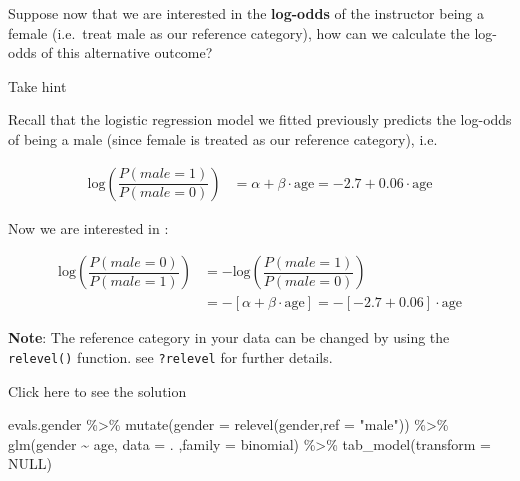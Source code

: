 \documentclass[
  letterpaper,
  DIV=11,
  numbers=noendperiod]{scrartcl}
\newenvironment{Shaded}{\begin{snugshade}}{\end{snugshade}}
\newcommand{\AttributeTok}[1]{\textcolor[rgb]{0.40,0.45,0.13}{#1}}
\newcommand{\ConstantTok}[1]{\textcolor[rgb]{0.56,0.35,0.01}{#1}}
\newcommand{\FunctionTok}[1]{\textcolor[rgb]{0.28,0.35,0.67}{#1}}
\newcommand{\NormalTok}[1]{\textcolor[rgb]{0.00,0.23,0.31}{#1}}
\newcommand{\SpecialCharTok}[1]{\textcolor[rgb]{0.37,0.37,0.37}{#1}}
\newcommand{\StringTok}[1]{\textcolor[rgb]{0.13,0.47,0.30}{#1}}
\begin{document}
\begin{tcolorbox}[enhanced jigsaw, colframe=quarto-callout-warning-color-frame, toprule=.15mm, toptitle=1mm, opacitybacktitle=0.6, breakable, colback=white, opacityback=0, title={Task}, rightrule=.15mm, bottomrule=.15mm, coltitle=black, colbacktitle=quarto-callout-warning-color!10!white, leftrule=.75mm, left=2mm, arc=.35mm, bottomtitle=1mm, titlerule=0mm]

Suppose now that we are interested in the \textbf{log-odds} of the
instructor being a female (i.e.~treat male as our reference category),
how can we calculate the log-odds of this alternative outcome?

Take hint

Recall that the logistic regression model we fitted previously predicts
the log-odds of being a male (since female is treated as our reference
category), i.e.

\begin{align}
\mathrm{log}\left(\dfrac{P(male=1)}{P(male=0)}\right) &= \alpha + \beta \cdot \textrm{age} = -2.7 + 0.06 \cdot \textrm{age}
\end{align}

Now we are interested in :

\begin{align}
\mathrm{log}\left(\dfrac{P(male=0)}{P(male=1)}\right) &= -\mathrm{log}\left(\dfrac{P(male=1)}{P(male=0)}\right) \\
&= -[ \alpha + \beta \cdot \textrm{age}] = -[-2.7 + 0.06] \cdot \textrm{age}
\end{align}

\textbf{Note}: The reference category in your data can be changed by
using the \texttt{relevel()} function. see \texttt{?relevel} for further
details.

Click here to see the solution

\begin{Shaded}
\begin{Highlighting}[]
\NormalTok{evals.gender }\SpecialCharTok{\%\textgreater{}\%} 
  \FunctionTok{mutate}\NormalTok{(}\AttributeTok{gender =} \FunctionTok{relevel}\NormalTok{(gender,}\AttributeTok{ref =} \StringTok{"male"}\NormalTok{)) }\SpecialCharTok{\%\textgreater{}\%}
  \FunctionTok{glm}\NormalTok{(gender }\SpecialCharTok{\textasciitilde{}}\NormalTok{ age, }\AttributeTok{data =}\NormalTok{ . ,}\AttributeTok{family =}\NormalTok{ binomial) }\SpecialCharTok{\%\textgreater{}\%} 
  \FunctionTok{tab\_model}\NormalTok{(}\AttributeTok{transform =} \ConstantTok{NULL}\NormalTok{)}
\end{Highlighting}
\end{Shaded}


\end{tcolorbox}
\end{document}
